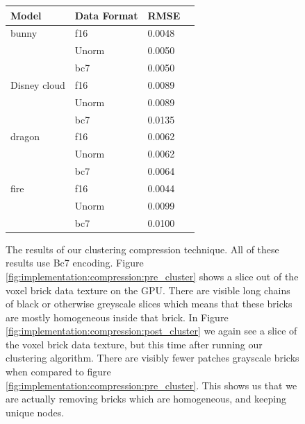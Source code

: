 \begin{figure}[H]
{        \begin{tabular}{|l|l|l|l|}
        \hline
        \textbf{Model} & \textbf{Data Format} & \textbf{RMSE} \\
        \hline
        bunny & f16 & 0.0048 \\
        & Unorm & 0.0050 \\
        & bc7 & 0.0050 \\
        \hline
        Disney cloud & f16 & 0.0089 \\
        & Unorm & 0.0089 \\
        & bc7 & 0.0135 \\
        \hline
        dragon & f16 & 0.0062 \\
        & Unorm & 0.0062 \\
        & bc7 & 0.0064 \\
        \hline
        fire & f16 & 0.0044 \\
        & Unorm & 0.0099 \\
        & bc7 & 0.0100 \\
        \hline
    \end{tabular}
    \label{tab:block_compression_visualized:table}
    }

    \caption{} \label{fig:block_compression_visualized}
\end{figure}

\begin{figure}[H]
    \centering
    \hfill
    \caption{The results of our clustering compression technique. All of these results use Bc7 encoding. Figure \ref{fig:implementation:compression:pre_cluster} shows a slice out of the voxel brick data texture on the GPU. There are visible long chains of black or otherwise greyscale slices which means that these bricks are mostly homogeneous inside that brick. In Figure \ref{fig:implementation:compression:post_cluster} we again see a slice of the voxel brick data texture, but this time after running our clustering algorithm. There are visibly fewer patches grayscale bricks when compared to figure \ref{fig:implementation:compression:pre_cluster}. This shows us that we are actually removing bricks which are homogeneous, and keeping unique nodes.} \label{fig:implementation:compression:cluster}
\end{figure}